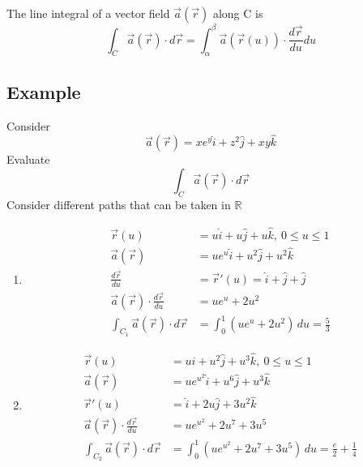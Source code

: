 \documentclass[a4paper, 11pt, normalem]{report}
\newcommand\veca{\vec{a}(\vec{r})}
\newcommand\veru{\vec{r}(u)}
\begin{document}
The line integral of a vector field $\veca$ along C is
\begin{equation*}
    \int_C \veca \cdot d\vec{r} = \int_{\alpha}^{\beta} \vec{a}(\veru) \cdot \frac{d\vec{r}}{du}du
\end{equation*}

\subsection{Example}
Consider
\begin{equation*}
    \veca = xe^y \hat{i} + z^2 \hat{j} + xy\hat{k}
\end{equation*}
Evaluate
\begin{equation*}
    \int_C \veca \cdot d\vec{r}
\end{equation*}
Consider different paths that can be taken in $\mathbb{R}$
\begin{enumerate}
    \item
            \begin{align*}
                \veru &= u\hat{i} + u\hat{j} + u\hat{k},~ 0 \leq u \leq 1 \\
                \veca &= ue^u \hat{i} + u^2 \hat{j} + u^2 \hat{k} \\
                \frac{d\vec{r}}{du} &= \vec{r}'(u) = \hat{i} + \hat{j} + \hat{j} \\
                \veca \cdot \frac{d\vec{r}}{du} &= ue^u + 2u^2 \\
                \int_{C_1} \veca \cdot d\vec{r} &= \int_{0}^{1} (ue^u + 2u^2)\,du = \frac{5}{3}
            \end{align*}
    \item
            \begin{align*}
                \veru &= u\hat{i} + u^2 \hat{j} + u^3 \hat{k},~ 0 \leq u \leq 1 \\
                \veca &= ue^{u^2}\hat{i} + u^6 \hat{j} + u^3 \hat{k} \\
                \vec{r}'(u) &= \hat{i} + 2u\hat{j} + 3u^2 \hat{k} \\
                \veca \cdot \frac{d\vec{r}}{du} &= ue^{u^2} + 2u^7 + 3u^5 \\
                \int_{C_2} \veca \cdot d\vec{r} &= \int_{0}^{1} (ue^{u^2} + 2u^7 + 3u^5)\,du = \frac{e}{2} + \frac{1}{4}
            \end{align*}
\end{enumerate}
\end{document}
